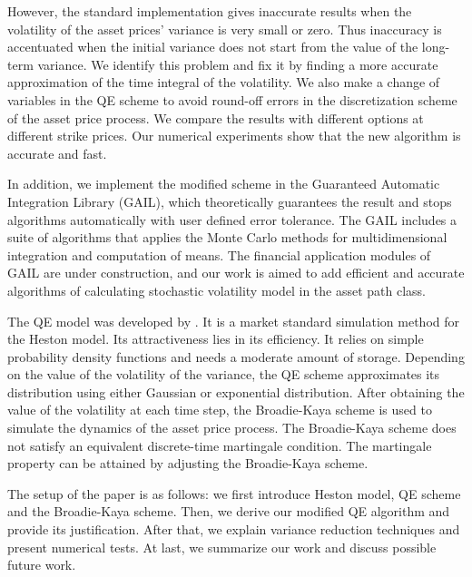 \documentclass{ws-ijfe}
\begin{document}
However, the standard implementation gives inaccurate results when the volatility of the asset prices' variance is very small or zero. Thus inaccuracy is accentuated when the initial variance does not start from the value of the long-term variance. We identify this problem and fix it by finding a more accurate approximation of the time integral of the volatility. We also make a change of variables in the QE scheme to avoid round-off errors in the discretization scheme of the asset price process. We compare the results with different options at different strike prices. Our numerical experiments show that the new algorithm is accurate and fast. %

In addition, we implement the modified scheme in the Guaranteed Automatic Integration Library (GAIL), which theoretically guarantees the result and stops algorithms automatically with user defined error tolerance. The GAIL includes a suite of algorithms that applies the Monte Carlo methods for multidimensional integration and computation of means. The financial application modules of GAIL are under construction, and our work is aimed to add efficient and accurate algorithms of calculating stochastic volatility model in the asset path class.

The QE model was developed by \cite{Andersen2006}. It is a market standard simulation method for the Heston model. Its attractiveness lies in its efficiency. It relies on simple probability density functions and needs a moderate amount of storage. Depending on the value of the volatility of the variance, the QE scheme approximates its distribution using either Gaussian or exponential distribution. After obtaining the value of the volatility at each time step, the Broadie-Kaya scheme is used to simulate the dynamics of the asset price process. The Broadie-Kaya scheme does not satisfy an equivalent discrete-time martingale condition. The martingale property can be attained by adjusting the Broadie-Kaya scheme.

The setup of the paper is as follows: we first introduce Heston model, QE scheme and the Broadie-Kaya scheme. Then, we derive our modified QE algorithm and provide its justification. After that, we explain variance reduction techniques and present numerical tests. At last, we summarize our work and discuss possible future work.
\end{document}
